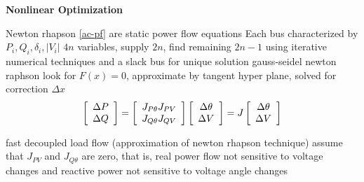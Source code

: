 \textbf{Nonlinear Optimization}

Newton rhapson
\ref{ac-pf} are static power flow equations
Each bus characterized by $P_i, Q_i, \delta_i, |V_i|$
$4 n$ variables, supply $2 n$, find remaining $2 n -1$ using iterative numerical techniques and a slack bus for unique solution
gauss-seidel
newton raphson  look for $F(x) = 0$, approximate by tangent hyper plane, solved for correction $\Delta x$
\begin{equation}
\left[ \begin{array}{ c } \Delta P \\ \Delta Q \end{array}	\right]
=
\left[ \begin{array}{ c c } J_{P \theta} J_{PV} \\ J_{Q \theta} J_{QV} \end{array}	\right]
\left[ \begin{array}{ c } \Delta \theta \\ \Delta V \end{array}	\right]
=
J \left[ \begin{array}{ c } \Delta \theta \\ \Delta V \end{array}	\right]
\end{equation}

fast decoupled load flow (approximation of newton rhapson technique)
assume that $J_{PV}$ and $J_{Q\theta}$ are zero, that is, real power flow not sensitive to voltage changes and reactive power not sensitive to voltage angle changes
